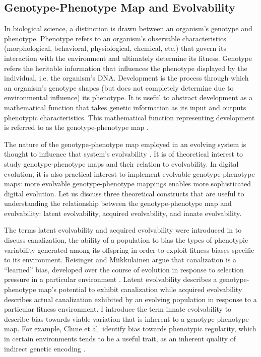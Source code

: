 \subsection{Genotype-Phenotype Map and Evolvability}

In biological science, a distinction is drawn between an organism's genotype and phenotype.
Phenotype refers to an organism's observable characteristics (morphological, behavioral, physiological, chemical, etc.) that govern its interaction with the environment and ultimately determine its fitness.
Genotype refers the heritable information that influences the phenotype displayed by the individual, i.e. the organism's DNA.
Development is the process through which an organism's genotype shapes (but does not completely determine due to environmental influence) its phenotype.
It is useful to abstract development as a mathematical function that takes genetic information as its input and outputs phenotypic characteristics.
This mathematical function representing development is referred to as the genotype-phenotype map \cite{alberch1991genes}.

The nature of the genotype-phenotype map employed in an evolving system is thought to influence that system's evolvability \cite{pigliucci2010genotype}.
It is of theoretical interest to study genotype-phenotype maps and their relation to evolvability.
In digital evolution, it is also practical interest to implement evolvable genotype-phenotype maps: more evolvable genotype-phenotype mappings enables more sophisticated digital evolution.
Let us discuss three theoretical constructs that are useful to understanding the relationship between the genotype-phenotype map and evolvability: latent evolvability, acquired evolvability, and innate evolvability.

The terms latent evolvability and acquired evolvability were introduced in \cite{reisinger2005towards} to discuss canalization, the ability of a population to bias the types of phenotypic variability generated among its offspring in order to exploit fitness biases specific to its environment.
Reisinger and Miikkulainen argue that canalization is a ``learned'' bias, developed over the course of evolution in response to selection pressure in a particular environment \cite{reisinger2005towards}.
Latent evolvability describes a genotype-phenotype map's potential to exhibit canalization while acquired evolvability describes actual canalization exhibited by an evolving population in response to a particular fitness environment.
I introduce the term innate evolvability to describe bias towards viable variation that is inherent to a genotype-phenotype map.
For example, Clune et al. identify bias towards phenotypic regularity, which in certain environments tends to be a useful trait, as an inherent quality of indirect genetic encoding \cite{clune2008generative}.


